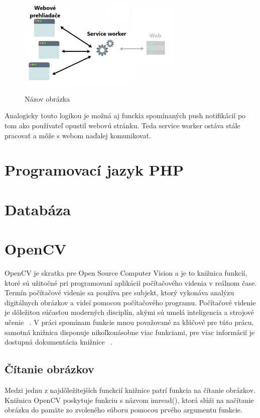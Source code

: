 \begin{figure}[H]
  \centering
  \includegraphics[width=0.7\textwidth]{img/image2.pdf}
  \caption{Názov obrázka \cite{Ater2017BuildingPWA}}
  \label{fig:obrazok2}
\end{figure}

Analogicky touto logikou je možná aj funckia spomínaných push notifikácií po tom ako používateľ opustil webovú stránku. Teda service worker ostáva
stále pracovať a môže s webom naďalej komunikovať.


\section {Programovací jazyk PHP}


\section {Databáza}


\section{OpenCV}
OpenCV je skratka pre Open Source Computer Vision a je to knižnica funkcií, ktoré sú užitočné pri programovaní 
aplikácií počítačového videnia v reálnom čase. Termín počítačové videnie sa používa pre subjekt, ktorý vykonáva 
analýzu digitálnych obrázkov a videí pomocou počítačového programu. Počítačové videnie je dôležitou súčasťou 
moderných disciplín, akými sú umelá inteligencia a strojové učenie ~\cite{tutorialspoint_opencv}. V práci 
spomínam funkcie mnou považované za kľúčové pre túto prácu, samotná knižnica disponuje nikoľkonásobne viac 
funkciami, pre viac informácií je dostupná dokumentácia knižnice ~\cite{documentation_opencv}.

\subsection{Čítanie obrázkov}
Medzi jednu z najdôležitejších funckcií knižnice patrí funkcia na čítanie obrázkov. Knižnica OpenCV poskytuje 
funkciu s názvom imread(), ktorá slúži na načítanie obrázku do pamäte zo zvoleného súboru pomocou prvého argumentu 
funkcie.  

